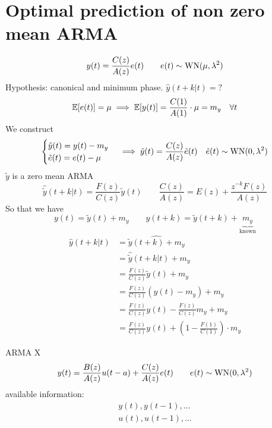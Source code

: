 \section{Optimal prediction of non zero mean ARMA}
\[
	y(t)=\frac{C(z)}{A(z)}e(t)\qquad e(t)\sim \operatorname{WN}(\mu,\lambda^2 )
\]
Hypothesis: canonical and minimum phase.
$\hat y(t+k|t)=?$
\[
	\mathbb{E}[e(t)]=\mu \implies \mathbb{E}[y(t)]=\frac{C(1)}{A(1)}\cdot\mu=m_{y} \quad \forall t
\]
We construct
\[
	\begin{cases}
		\tilde y(t)=y(t)-m_{y}\\
		\tilde e(t)=e(t)-\mu
	\end{cases}
	\implies 
	\tilde y(t)=\frac{C(z)}{A(z)}\tilde e(t) \quad \tilde e(t)\sim \operatorname{WN}(0,\lambda^2)
\]
$\tilde y$ is a zero mean ARMA
\[
	\hat{\tilde y} (t+k|t) = \frac{F(z)}{C(z)}\tilde y(t) \qquad \frac{C(z)}{A(z)}=E(z)+\frac{z^{-k}F(z) }{A(z)}
\]
So that we have
\[
	y(t)=\tilde y(t)+m_{y} \qquad y(t+k)=\tilde y(t+k)+\underbrace{m_{y}}_{\text{known}}
\]
\begin{align*}
	\hat y(t+k|t)&=\widehat{\tilde y(t+k)+m_{y}}\\
	&= \hat{\tilde y}(t+k|t)+m_{y}\\
	&=\frac{F(z)}{C(z)}\tilde y(t)+m_{y}\\
	&=\frac{F(z)}{C(z)}(y(t)-m_{y})+m_{y}\\
	&=\frac{F(z)}{C(z)}y(t)-\frac{F(z)}{C(z)}m_{y}+m_{y}\\
	&=\frac{F(z)}{C(z)}y(t)+\left( 1-\frac{F(1)}{C(1)} \right)  \cdot m_{y}
\end{align*}

ARMA X
\[
	y(t)=\frac{B(z)}{A(z)} u(t-a)+\frac{C(z)}{A(z)}e(t)\qquad e(t)\sim \operatorname{WN}(0,\lambda^2 )
\]
available information:
\begin{gather*}
	y(t),y(t-1),\ldots \\
	u(t),u(t-1),\ldots
\end{gather*}































